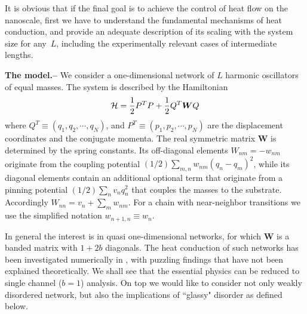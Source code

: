 \documentclass[onecolumn,fleqn,notitlepage,secnumarabic]{revtex4}
\newcommand{\sect}[1]{{\bf #1.-- }}
\begin{document}

It is obvious that if the final goal 
is to achieve the control of heat flow on the nanoscale, 
first we have to understand the fundamental mechanisms of heat conduction, 
and provide an adequate description of its scaling with the system size for any~$L$, 
including the experimentally relevant cases of intermediate lengths.

\sect{The model}
%
We consider a one-dimensional network of $L$ harmonic oscillators of equal masses. 
The system is described by the Hamiltonian 
% 
\begin{equation}
{\cal H} = {1\over 2} P^T P + {1\over 2} Q^T \bm{W} Q 
\label{Hmatrix} 
\end{equation}
%
where $Q^T\equiv(q_1,q_2,\cdots,q_N)$, and $P^T\equiv(p_1,p_2,\cdots,p_N)$ 
are the displacement coordinates and the conjugate momenta. 
The real symmetric matrix  $\bm{W}$ is determined by the spring constants.
Its off-diagonal elements $W_{nm}{=}-w_{nm}$ originate from 
the coupling potential $(1/2)\sum_{m,n}w_{nm}(q_n-q_m)^2$, 
while its diagonal elements contain an additional 
optional term that originate from a pinning potential ${(1/2)\sum_n v_n q_n^2}$ 
that couples the masses to the substrate. 
Accordingly ${W_{nn}=v_n+\sum_m w_{nm}}$. 
For a chain with near-neighbor transitions we use 
the simplified notation ${w_{n{+}1,n} \equiv w_n}$.  


In general the interest is in quasi one-dimensional networks, 
for which $\bm{W}$ is a banded matrix with ${1{+}2b}$ diagonals. 
The heat conduction of such networks has been investigated numerically 
in \cite{BZFK13}, with puzzling findings that have not been explained 
theoretically. We shall see that the essential physics can be 
reduced to single channel ($b=1$) analysis. On top we would like  
to consider not only weakly disordered network, but also 
the implications of ``glassy" disorder as defined below.   
\end{document}
